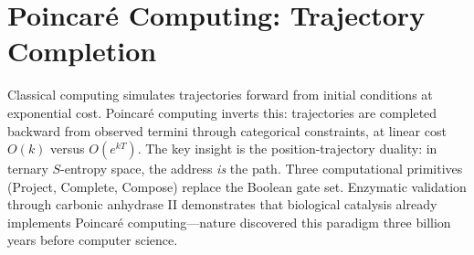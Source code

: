 \chapter{Poincaré Computing: Trajectory Completion}
\label{ch:poincare}


\begin{chapterabstract}
Classical computing simulates trajectories forward from initial conditions at exponential cost. Poincaré computing inverts this: trajectories are completed backward from observed termini through categorical constraints, at linear cost $O(k)$ versus $O(e^{kT})$. The key insight is the position-trajectory duality: in ternary $S$-entropy space, the address \emph{is} the path. Three computational primitives (Project, Complete, Compose) replace the Boolean gate set. Enzymatic validation through carbonic anhydrase II demonstrates that biological catalysis already implements Poincaré computing---nature discovered this paradigm three billion years before computer science.
\end{chapterabstract}


